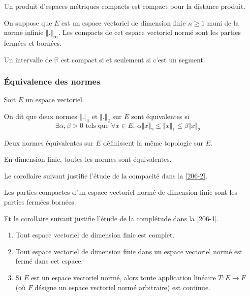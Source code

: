 	\begin{proposition}
		Un produit d'espaces métriques compacts est compact pour la distance produit.
	\end{proposition}

	\begin{proposition}
		On suppose que $E$ est un espace vectoriel de dimension finie $n \geq 1$ muni de la norme infinie $\Vert . \Vert_\infty$. Les compacts de cet espace vectoriel normé sont les parties fermées et bornées.
	\end{proposition}

	\begin{application}
		Un intervalle de $\mathbb{R}$ est compact si et seulement si c'est un segment.
	\end{application}

	\subsubsection{Équivalence des normes}


	Soit $E$ un espace vectoriel.

	\begin{definition}
		On dit que deux normes $\Vert . \Vert_1$ et $\Vert . \Vert_2$ sur $E$ sont équivalentes si
		\[ \exists \alpha, \beta > 0 \text{ tels que } \forall x \in E, \, \alpha \Vert x \Vert_2 \leq \Vert x \Vert_1 \leq \beta \Vert x \Vert_2 \]
	\end{definition}

	\begin{remark}
		Deux normes équivalentes sur $E$ définissent la même topologie sur $E$.
	\end{remark}

	\begin{theorem}
		En dimension finie, toutes les normes sont équivalentes.
	\end{theorem}

	Le corollaire suivant justifie l'étude de la compacité dans la \cref{206-2}.

	\begin{corollary}
		Les parties compactes d'un espace vectoriel normé de dimension finie sont les parties fermées bornées.
	\end{corollary}

	Et le corollaire suivant justifie l'étude de la complétude dans la \cref{206-1}.

	\begin{corollary}
		\begin{enumerate}[label=(\roman*)]
			\item Tout espace vectoriel de dimension finie est complet.
			\item Tout espace vectoriel de dimension finie dans un espace vectoriel normé est fermé dans cet espace.
			\item Si $E$ est un espace vectoriel normé, alors toute application linéaire $T : E \rightarrow F$ (où $F$ désigne un espace vectoriel normé arbitraire) est continue.
		\end{enumerate}
	\end{corollary}


